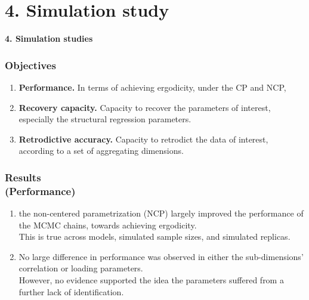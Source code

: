 \documentclass[nonav,sleutel]{beamer}
\begin{document}
	\section{4. Simulation study}
	\begin{frame}
		\LARGE{\textbf{4. Simulation studies}}
	\end{frame}
	\begin{frame}
		\frametitle{Objectives}
		\begin{enumerate}
			\item \textbf{Performance.} In terms of achieving ergodicity, under the CP and NCP, 
			\item \textbf{Recovery capacity.} Capacity to recover the parameters of interest, especially the structural regression parameters.
			\item \textbf{Retrodictive accuracy.} Capacity to retrodict the data of interest, according to a set of aggregating dimensions.
		\end{enumerate} 
	\end{frame}
	\begin{frame}
		\frametitle{Results \\
			(Performance)}
		\begin{enumerate}
			\item the non-centered parametrization (NCP) largely
			improved the performance of the MCMC chains, towards achieving ergodicity.\\
			\vspace{0.3cm} This is true across models, simulated sample sizes, and simulated replicas.
			\item No large difference in performance was observed in either the sub-dimensions’ correlation or loading parameters.\\
			\vspace{0.3cm} However, no evidence supported the idea the parameters suffered from a further lack of identification.
		\end{enumerate} 
	\end{frame}
\end{document}
